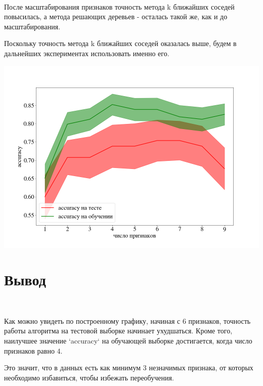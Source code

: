 \documentclass[12pt]{article}
\begin{document}
$ $  
  
После масштабирования признаков точность метода k ближайших соседей повысилась, а метода решающих деревьев - осталась такой же, как и до масштабирования.

Поскольку точность метода k ближайших соседей оказалась выше, будем в дальнейших экспериментах использовать именно его.  
  
\includegraphics[scale=0.4]{accuracy.png}  
  
\section*{Вывод}

$ $


Как можно увидеть по построенному графику, начиная с 6 признаков, точность работы алгоритма на тестовой выборке начинает ухудшаться. Кроме того, наилучшее значение `accuracy` на обучающей выборке достигается, когда число признаков равно 4.

Это значит, что в данных есть как минимум 3 незначимых признака, от которых необходимо избавиться, чтобы избежать переобучения. 
\end{document}
